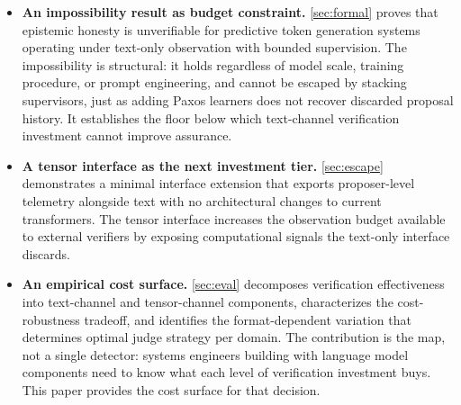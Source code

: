 \begin{itemize}
\item \textbf{An impossibility result as budget constraint.}
  \autoref{sec:formal} proves that epistemic honesty is unverifiable for
  predictive token generation systems operating under text-only observation with
  bounded supervision. The impossibility is structural: it holds regardless of
  model scale, training procedure, or prompt engineering, and cannot be escaped
  by stacking supervisors, just as adding Paxos learners does not recover
  discarded proposal history. It establishes the floor below which text-channel
  verification investment cannot improve assurance.

\item \textbf{A tensor interface as the next investment tier.}
  \autoref{sec:escape} demonstrates a minimal interface extension that exports
  proposer-level telemetry alongside text with no architectural changes to
  current transformers. The tensor interface increases the observation budget
  available to external verifiers by exposing computational signals the
  text-only interface discards.

\item \textbf{An empirical cost surface.}
  \autoref{sec:eval} decomposes verification effectiveness into text-channel and
  tensor-channel components, characterizes the cost-robustness tradeoff, and
  identifies the format-dependent variation that determines optimal judge
  strategy per domain. The contribution is the map, not a single detector: systems
  engineers building with language model components need to know what each level
  of verification investment buys. This paper provides the cost surface for that
  decision.
\end{itemize}
